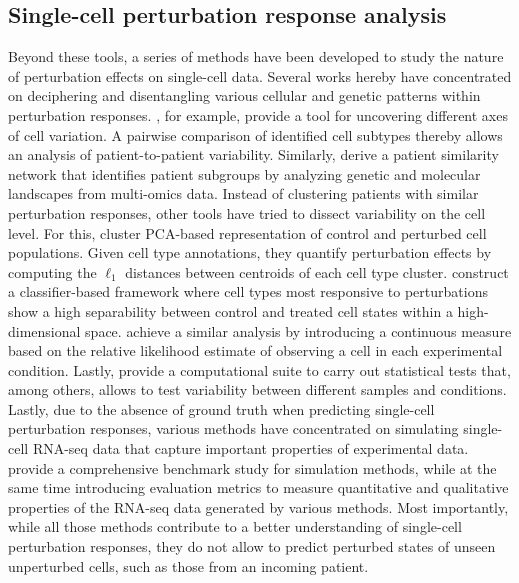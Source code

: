 \subsection{Single-cell perturbation response analysis}
Beyond these tools, a series of methods have been developed to study the nature of perturbation effects on single-cell data. Several works hereby have concentrated on deciphering and disentangling various cellular and genetic patterns within perturbation responses.
\citet{chen2020}, for example, provide a tool for uncovering different axes of cell variation. A pairwise comparison of identified cell subtypes thereby allows an analysis of patient-to-patient variability.
Similarly, \citet{bhalla2021} derive a patient similarity network that identifies patient subgroups by analyzing genetic and molecular landscapes from multi-omics data.
Instead of clustering patients with similar perturbation responses, other tools have tried to dissect variability on the cell level.
For this, \citet{chari2021} cluster PCA-based representation of control and perturbed cell populations. Given cell type annotations, they quantify perturbation effects by computing the $\ell_1$ distances between centroids of each cell type cluster.
\citet{skinnider2021} construct a classifier-based framework where cell types most responsive to perturbations show a high separability between control and treated cell states within a high-dimensional space.
\citet{burkhardt2021} achieve a similar analysis by introducing a continuous measure based on the relative likelihood estimate of  observing a cell in each experimental condition.
Lastly, \citet{petukhov2022} provide a computational suite to carry out statistical tests that, among others, allows to test variability between different samples and conditions.
Lastly, due to the absence of ground truth when predicting single-cell perturbation responses, various methods have concentrated on simulating single-cell RNA-seq data that capture important properties of experimental data.
\citet{cao2021a} provide a comprehensive benchmark study for simulation methods, while at the same time introducing evaluation metrics to measure quantitative and qualitative properties of the RNA-seq data generated by various methods. 
Most importantly, while all those methods contribute to a better understanding of single-cell perturbation responses, they do not allow to predict perturbed states of unseen unperturbed cells, such as those from an incoming patient.



